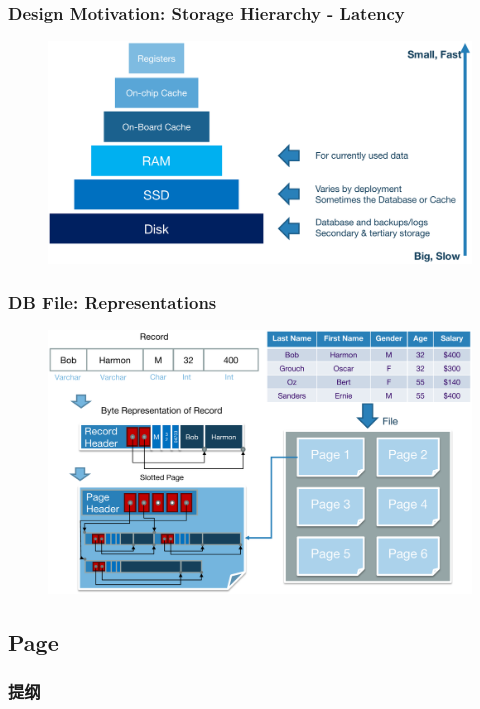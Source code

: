 \begin{frame}[fragile]
	\frametitle{Design Motivation: Storage Hierarchy - Latency}
	\begin{figure}
		\includegraphics[width=0.85\linewidth]{figs/dbfile-latency2.pdf}
	\end{figure}
\end{frame}





\begin{frame}[fragile]
	\frametitle{DB File: Representations}
	\begin{figure}
		\includegraphics[width=0.75\linewidth]{figs/dbfile-representation.pdf}
	\end{figure}
\end{frame}


\subsection{Page}
\begin{frame}
\frametitle{提纲} %
\tableofcontents %

\end{frame}

